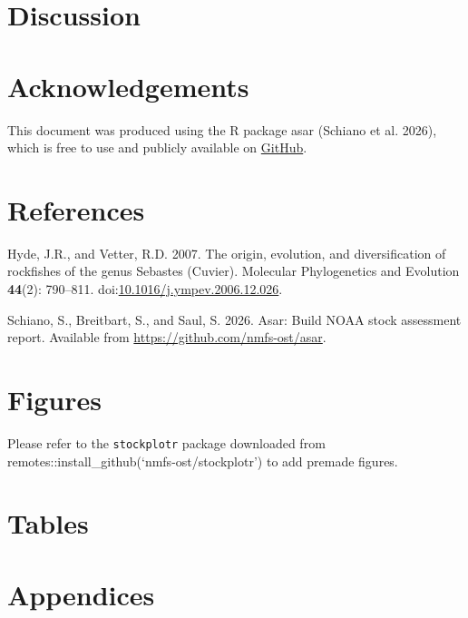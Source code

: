 \documentclass[
  letterpaper,
]{article}
\newlength{\cslhangindent}
\newenvironment{CSLReferences}[2] %
 {\begin{list}{}{%
  \setlength{\itemindent}{0pt}
  \setlength{\leftmargin}{0pt}
  \setlength{\parsep}{0pt}
  \ifodd #1
   \setlength{\leftmargin}{\cslhangindent}
   \setlength{\itemindent}{-1\cslhangindent}
  \fi
  \setlength{\itemsep}{#2\baselineskip}}}
 {\end{list}}
\begin{document}
\newpage{}

\section{Discussion}\label{sec-discussion}

\newpage{}

\section{Acknowledgements}\label{sec-acknowledgements}

This document was produced using the R package asar (Schiano et al.
2026), which is free to use and publicly available on
\href{https://github.com/nmfs-ost/asar}{GitHub}.

\newpage{}

\section{References}\label{sec-refs}

\label{refs}
\begin{CSLReferences}{1}{0}
Hyde, J.R., and Vetter, R.D. 2007. The origin, evolution, and
diversification of rockfishes of the genus {Sebastes} ({Cuvier}).
Molecular Phylogenetics and Evolution \textbf{44}(2): 790--811.
doi:\href{https://doi.org/10.1016/j.ympev.2006.12.026}{10.1016/j.ympev.2006.12.026}.

Schiano, S., Breitbart, S., and Saul, S. 2026. Asar: Build NOAA stock
assessment report. Available from
\url{https://github.com/nmfs-ost/asar}.

\end{CSLReferences}

\newpage{}

\section{Figures}\label{sec-figures}

Please refer to the \texttt{stockplotr} package downloaded from
remotes::install\_github(`nmfs-ost/stockplotr') to add premade figures.

\newpage{}

\section{Tables}\label{sec-tables}

\clearpage

\newpage{}

\appendix
\setcounter{figure}{0}
\setcounter{table}{0}

\section{Appendices}\label{sec-appendix}
\end{document}

